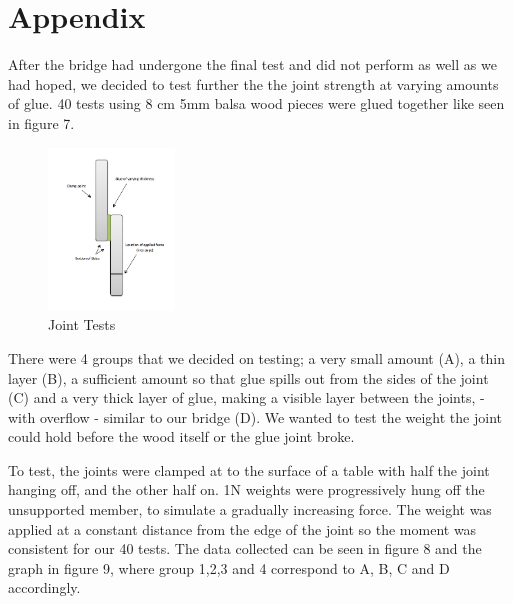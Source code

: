 \documentclass[12pt]{article}
\begin{document}
\section*{Appendix}
After the bridge had undergone the final test and did not perform as well as we had hoped, we decided to test further the the joint strength at varying amounts of glue. 40 tests using 8 cm 5mm balsa wood pieces were glued together like seen in figure 7.
                \begin{figure}[h!]
			\centering
			\includegraphics[width=0.3\textwidth]{Jointtest}
			\caption{Joint Tests}
			\label{Joint Testing}
		\end{figure}

There were 4 groups that we decided on testing; a very small amount (A), a thin layer (B), a sufficient amount so that glue spills out from the sides of the joint (C) and a very thick layer of glue, making a visible layer between the joints, - with overflow -  similar to our bridge (D).
We wanted to test the weight the joint could hold before the wood itself or the glue joint broke.

To test, the joints were clamped at to the surface of a table with half the joint hanging off, and the other half on. 1N weights were progressively hung off  the unsupported member, to simulate a gradually increasing force. The weight was applied at a constant distance from the edge of the joint so the moment was consistent for our 40 tests.
The data collected can be seen in figure 8 and the graph in figure 9, where group 1,2,3 and 4 correspond to A, B, C and D accordingly.
		
\end{document}
